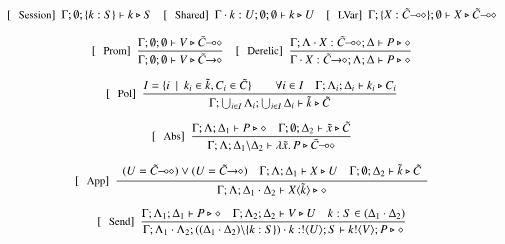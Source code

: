 \begin{figure}[!t]
\[
	\begin{array}{c}
		\trule{Session}~~\Gamma; \emptyset; \set{k:S} \proves k \hastype S 
		\quad
		\trule{Shared}~~\Gamma \cat k : U; \emptyset; \emptyset \proves k \hastype U
		\quad
		\trule{LVar}~~\Gamma; \set{X: \lhot{\tilde{C}}}; \emptyset \proves X \hastype \lhot{\tilde{C}}
		\\[4mm]

		\trule{Prom}~~\tree{
			\Gamma; \emptyset; \emptyset \proves V \hastype \lhot{\tilde{C}}
		}{
			\Gamma; \emptyset; \emptyset \proves V \hastype \shot{\tilde{C}}
		} 
		\quad
		\trule{Derelic}~~\tree{
			\Gamma; \Lambda \cat X : \lhot{\tilde{C}}; \Delta \proves P \hastype \Proc
		}{
			\Gamma \cat X:\shot{\tilde{C}}; \Lambda; \Delta \proves P \hastype \Proc
		}
		\\[6mm]

		\trule{Pol}~~\tree{
			I = \set{i \setbar k_i \in \tilde{k}, C_i \in \tilde{C}}
			\qquad
			\forall i \in I \quad \Gamma; \Lambda_i; \Delta_i \proves k_i \hastype C_i
		}{
			\Gamma; \bigcup_{i \in I} \Lambda_i; \bigcup_{i \in I} \Delta_i \proves \tilde{k} \hastype \tilde{C}
		}
		\\[6mm]

		\trule{Abs}~~\tree{
			\Gamma; \Lambda; \Delta_1 \proves P \hastype \Proc
			\quad
			\Gamma; \es; \Delta_2 \proves \tilde{x} \hastype \tilde{C}
		}{
			\Gamma; \Lambda; \Delta_1 \backslash \Delta_2 \proves \abs{\tilde{x}}{P} \hastype \lhot{\tilde{C}}
		}
		\\[6mm]

		\trule{App}~~\tree{
			\begin{array}{c}
				(U = \lhot{\tilde{C}}) \lor (U = \shot{\tilde{C}})
				\quad
				\Gamma; \Lambda; \Delta_1 \proves X \hastype U
				\quad
				\Gamma; \es; \Delta_2 \proves \tilde{k} \hastype \tilde{C}
			\end{array}
		}{
			\Gamma; \Lambda; \Delta_1 \cat \Delta_2 \proves \appl{X}{\tilde{k}} \hastype \Proc
		} 
		\\[6mm]


		\trule{Send}~~\tree{
			\Gamma; \Lambda_1; \Delta_1 \proves P \hastype \Proc
			\quad
			\Gamma; \Lambda_2; \Delta_2 \proves V \hastype U
			\quad
			k:S \in (\Delta_1 \cat \Delta_2)
		}{
			\Gamma; \Lambda_1 \cat \Lambda_2; ((\Delta_1 \cat \Delta_2) \backslash \set{k:S}) \cat k:\btout{U} S \proves \bout{k}{V} P \hastype \Proc
		}
		\\[6mm]


\end{array}\]
\end{figure}

